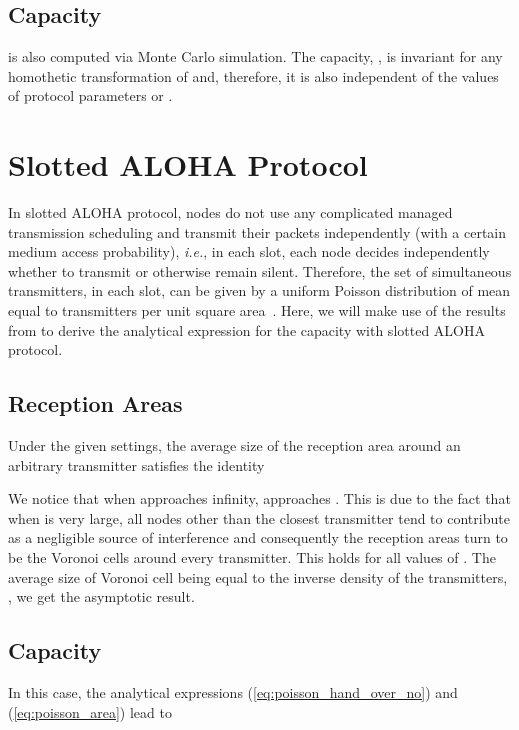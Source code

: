 \documentclass[12pt,english]{article}
\begin{document}
\subsection{Capacity}

 
is also computed via Monte Carlo simulation. The capacity, , is invariant for any homothetic transformation of  and, therefore, it is also independent of the values of protocol parameters  or .

\section{Slotted ALOHA Protocol}
\label{sec:aloha}

In slotted ALOHA protocol, nodes do not use any complicated managed transmission scheduling and transmit their packets independently (with a certain medium access probability), {\it i.e.}, in each slot, each node decides independently whether to transmit or otherwise remain silent. Therefore, the set of simultaneous transmitters, in each slot, can be given by a uniform Poisson distribution of mean equal to  transmitters per unit square area~\cite{Jacquet:2009,SR-ALOHA,Weber2}. Here, we will make use of the results from \cite{Jacquet:2009} to derive the analytical expression for the capacity with slotted ALOHA protocol.

\subsection{Reception Areas}

Under the given settings, the average size of the reception area around an arbitrary transmitter satisfies the identity


We notice that when  approaches infinity,  approaches . This is due to the fact that when  is very large, all nodes other than the closest transmitter tend to contribute as a negligible source of interference and consequently the reception areas turn to be the Voronoi cells around every transmitter. This holds for all values of . The average size of Voronoi cell being equal to the inverse density of the transmitters,
, we get the asymptotic result. 

\subsection{Capacity}

In this case, the analytical expressions (\ref{eq:poisson_hand_over_no}) and (\ref{eq:poisson_area}) lead to 
\end{document}
